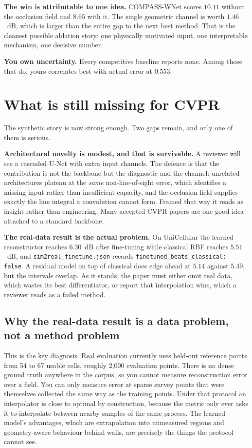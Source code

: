 \documentclass[11pt,a4paper]{article}
\begin{document}
\textbf{The win is attributable to one idea.} COMPASS-WNet scores $10.11$ without the
occlusion field and $8.65$ with it. The single geometric channel is worth $1.46$~dB,
which is larger than the entire gap to the next best method. That is the cleanest
possible ablation story: one physically motivated input, one interpretable mechanism,
one decisive number.

\textbf{You own uncertainty.} Every competitive baseline reports none. Among those that
do, yours correlates best with actual error at $0.553$.

\section{What is still missing for CVPR}

The synthetic story is now strong enough. Two gaps remain, and only one of them is
serious.

\textbf{Architectural novelty is modest, and that is survivable.} A reviewer will see a
cascaded U-Net with extra input channels. The defence is that the contribution is not
the backbone but the diagnostic and the channel: unrelated architectures plateau at the
\emph{same} non-line-of-sight error, which identifies a missing input rather than
insufficient capacity, and the occlusion field supplies exactly the line integral a
convolution cannot form. Framed that way it reads as insight rather than engineering.
Many accepted CVPR papers are one good idea attached to a standard backbone.

\textbf{The real-data result is the actual problem.} On UniCellular the learned
reconstructor reaches $6.30$~dB after fine-tuning while classical RBF reaches
$5.51$~dB, and \texttt{sim2real\_finetune.json} records
\texttt{finetuned\_beats\_classical: false}. A residual model on top of classical does
edge ahead at $5.14$ against $5.49$, but the intervals overlap. As it stands, the paper
must either omit real data, which wastes its best differentiator, or report that
interpolation wins, which a reviewer reads as a failed method.

\subsection{Why the real-data result is a data problem, not a method problem}

This is the key diagnosis. Real evaluation currently uses held-out reference points from
54 to 67 usable cells, roughly 2{,}000 evaluation points. There is no dense ground truth
anywhere in the corpus, so you cannot measure reconstruction error over a field. You can
only measure error at sparse survey points that were themselves collected the same way
as the training points. Under that protocol an interpolator is close to optimal by
construction, because the metric only ever asks it to interpolate between nearby samples
of the same process. The learned model's advantages, which are extrapolation into
unmeasured regions and geometry-aware behaviour behind walls, are precisely the things
the protocol cannot see.
\end{document}
